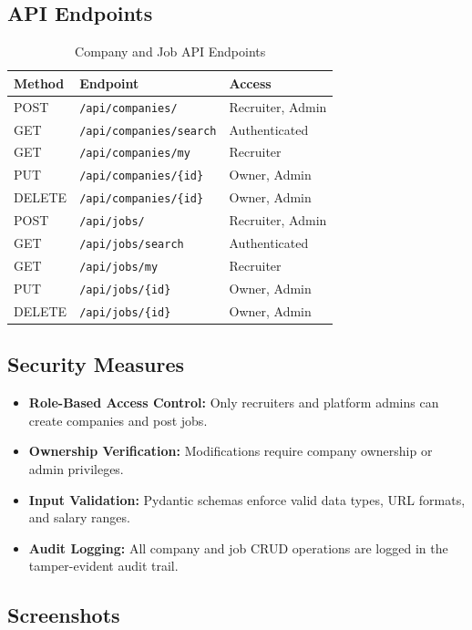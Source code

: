 \documentclass[12pt,a4paper]{article}
\begin{document}
\subsection{API Endpoints}
\begin{table}[H]
\centering
\begin{tabular}{lll}
\toprule
\textbf{Method} & \textbf{Endpoint} & \textbf{Access} \\
\midrule
POST & \texttt{/api/companies/} & Recruiter, Admin \\
GET & \texttt{/api/companies/search} & Authenticated \\
GET & \texttt{/api/companies/my} & Recruiter \\
PUT & \texttt{/api/companies/\{id\}} & Owner, Admin \\
DELETE & \texttt{/api/companies/\{id\}} & Owner, Admin \\
\midrule
POST & \texttt{/api/jobs/} & Recruiter, Admin \\
GET & \texttt{/api/jobs/search} & Authenticated \\
GET & \texttt{/api/jobs/my} & Recruiter \\
PUT & \texttt{/api/jobs/\{id\}} & Owner, Admin \\
DELETE & \texttt{/api/jobs/\{id\}} & Owner, Admin \\
\bottomrule
\end{tabular}
\caption{Company and Job API Endpoints}
\end{table}

\subsection{Security Measures}
\begin{itemize}
  \item \textbf{Role-Based Access Control:} Only recruiters and platform admins can create companies and post jobs.
  \item \textbf{Ownership Verification:} Modifications require company ownership or admin privileges.
  \item \textbf{Input Validation:} Pydantic schemas enforce valid data types, URL formats, and salary ranges.
  \item \textbf{Audit Logging:} All company and job CRUD operations are logged in the tamper-evident audit trail.
\end{itemize}

\subsection{Screenshots}
\end{document}
